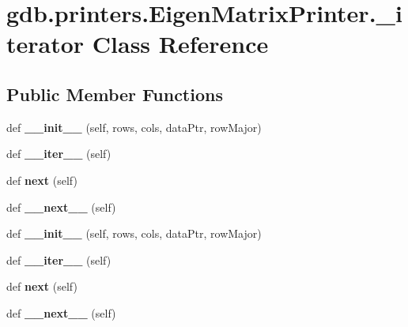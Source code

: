 \hypertarget{classgdb_1_1printers_1_1_eigen_matrix_printer_1_1__iterator}{}\section{gdb.\+printers.\+Eigen\+Matrix\+Printer.\+\_\+iterator Class Reference}
\label{classgdb_1_1printers_1_1_eigen_matrix_printer_1_1__iterator}
\subsection*{Public Member Functions}
\begin{DoxyCompactItemize}
\item 
\mbox{\label{classgdb_1_1printers_1_1_eigen_matrix_printer_1_1__iterator_aefbecb8941decbc8b83dc56335e69c75}} 
def {\bfseries \+\_\+\+\_\+init\+\_\+\+\_\+} (self, rows, cols, data\+Ptr, row\+Major)
\item 
\mbox{\label{classgdb_1_1printers_1_1_eigen_matrix_printer_1_1__iterator_aa703d0e9d61bedf50d3a8f724bf1f1b7}} 
def {\bfseries \+\_\+\+\_\+iter\+\_\+\+\_\+} (self)
\item 
\mbox{\label{classgdb_1_1printers_1_1_eigen_matrix_printer_1_1__iterator_a3ffef20eb03cc14a8524cac18c2b89c5}} 
def {\bfseries next} (self)
\item 
\mbox{\label{classgdb_1_1printers_1_1_eigen_matrix_printer_1_1__iterator_a46f72eca8ff8788d46671ac364beef1b}} 
def {\bfseries \+\_\+\+\_\+next\+\_\+\+\_\+} (self)
\item 
\mbox{\label{classgdb_1_1printers_1_1_eigen_matrix_printer_1_1__iterator_aefbecb8941decbc8b83dc56335e69c75}} 
def {\bfseries \+\_\+\+\_\+init\+\_\+\+\_\+} (self, rows, cols, data\+Ptr, row\+Major)
\item 
\mbox{\label{classgdb_1_1printers_1_1_eigen_matrix_printer_1_1__iterator_aa703d0e9d61bedf50d3a8f724bf1f1b7}} 
def {\bfseries \+\_\+\+\_\+iter\+\_\+\+\_\+} (self)
\item 
\mbox{\label{classgdb_1_1printers_1_1_eigen_matrix_printer_1_1__iterator_a3ffef20eb03cc14a8524cac18c2b89c5}} 
def {\bfseries next} (self)
\item 
\mbox{\label{classgdb_1_1printers_1_1_eigen_matrix_printer_1_1__iterator_a46f72eca8ff8788d46671ac364beef1b}} 
def {\bfseries \+\_\+\+\_\+next\+\_\+\+\_\+} (self)
\end{DoxyCompactItemize}
